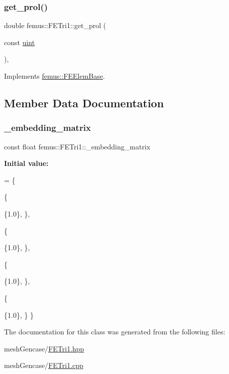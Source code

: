 \mbox{\label{classfemus_1_1_f_e_tri1_a0884505ef66c9b96487c9faaff0a0c5d}} 
\subsubsection{\texorpdfstring{get\+\_\+prol()}{get\_prol()}}
{\footnotesize\ttfamily double femus\+::\+F\+E\+Tri1\+::get\+\_\+prol (\begin{DoxyParamCaption}\item[{const \mbox{\hyperlink{_typedefs_8hpp_a91ad9478d81a7aaf2593e8d9c3d06a14}{uint}}}]{ }\end{DoxyParamCaption})\hspace{0.3cm}{\ttfamily [inline]}, {\ttfamily [virtual]}}



Implements \mbox{\hyperlink{classfemus_1_1_f_e_elem_base_ac82326cdc7cb02329c7be9547d56fad4}{femus\+::\+F\+E\+Elem\+Base}}.



\subsection{Member Data Documentation}
\mbox{\label{classfemus_1_1_f_e_tri1_af24307019af6d1b13e4585b16325a377}} 
\subsubsection{\texorpdfstring{\+\_\+embedding\+\_\+matrix}{\_embedding\_matrix}}
{\footnotesize\ttfamily const float femus\+::\+F\+E\+Tri1\+::\+\_\+embedding\+\_\+matrix\hspace{0.3cm}{\ttfamily [static]}}

{\bfseries Initial value\+:}
\begin{DoxyCode}
=
\{ 
  
  \{
    
    \{1.0\}, 
  \},
  
  \{
    
    \{1.0\}, 
  \},
  
  \{
    
    \{1.0\}, 
  \},
  
  \{
    
    \{1.0\}, 
  \}
\}
\end{DoxyCode}


The documentation for this class was generated from the following files\+:\begin{DoxyCompactItemize}
\item 
mesh\+Gencase/\mbox{\hyperlink{_f_e_tri1_8hpp}{F\+E\+Tri1.\+hpp}}\item 
mesh\+Gencase/\mbox{\hyperlink{_f_e_tri1_8cpp}{F\+E\+Tri1.\+cpp}}\end{DoxyCompactItemize}

